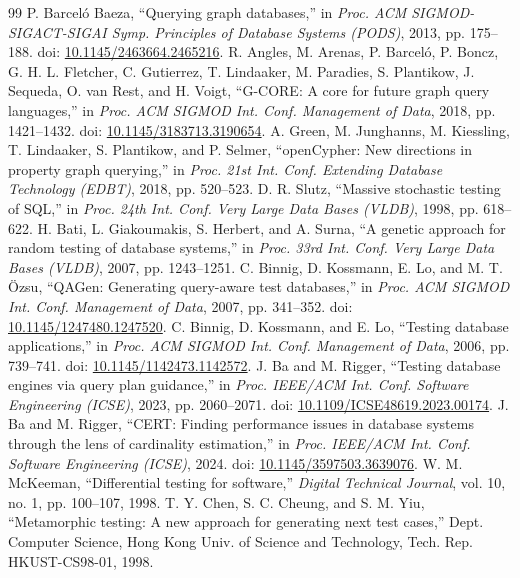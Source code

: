 \documentclass[acmsmall,screen,anonymous]{acmart}
\begin{document}
\begin{thebibliography}{99}
 P. Barceló Baeza, ``Querying graph databases,'' in \emph{Proc. ACM SIGMOD-SIGACT-SIGAI Symp. Principles of Database Systems (PODS)}, 2013, pp. 175--188. doi: \href{https://doi.org/10.1145/2463664.2465216}{10.1145/2463664.2465216}.
 R. Angles, M. Arenas, P. Barceló, P. Boncz, G. H. L. Fletcher, C. Gutierrez, T. Lindaaker, M. Paradies, S. Plantikow, J. Sequeda, O. van Rest, and H. Voigt, ``G-CORE: A core for future graph query languages,'' in \emph{Proc. ACM SIGMOD Int. Conf. Management of Data}, 2018, pp. 1421--1432. doi: \href{https://doi.org/10.1145/3183713.3190654}{10.1145/3183713.3190654}.
 A. Green, M. Junghanns, M. Kiessling, T. Lindaaker, S. Plantikow, and P. Selmer, ``openCypher: New directions in property graph querying,'' in \emph{Proc. 21st Int. Conf. Extending Database Technology (EDBT)}, 2018, pp. 520--523.
 D. R. Slutz, ``Massive stochastic testing of SQL,'' in \emph{Proc. 24th Int. Conf. Very Large Data Bases (VLDB)}, 1998, pp. 618--622.
 H. Bati, L. Giakoumakis, S. Herbert, and A. Surna, ``A genetic approach for random testing of database systems,'' in \emph{Proc. 33rd Int. Conf. Very Large Data Bases (VLDB)}, 2007, pp. 1243--1251.
 C. Binnig, D. Kossmann, E. Lo, and M. T. Özsu, ``QAGen: Generating query-aware test databases,'' in \emph{Proc. ACM SIGMOD Int. Conf. Management of Data}, 2007, pp. 341--352. doi: \href{https://doi.org/10.1145/1247480.1247520}{10.1145/1247480.1247520}.
 C. Binnig, D. Kossmann, and E. Lo, ``Testing database applications,'' in \emph{Proc. ACM SIGMOD Int. Conf. Management of Data}, 2006, pp. 739--741. doi: \href{https://doi.org/10.1145/1142473.1142572}{10.1145/1142473.1142572}.
 J. Ba and M. Rigger, ``Testing database engines via query plan guidance,'' in \emph{Proc. IEEE/ACM Int. Conf. Software Engineering (ICSE)}, 2023, pp. 2060--2071. doi: \href{https://doi.org/10.1109/ICSE48619.2023.00174}{10.1109/ICSE48619.2023.00174}.
 J. Ba and M. Rigger, ``CERT: Finding performance issues in database systems through the lens of cardinality estimation,'' in \emph{Proc. IEEE/ACM Int. Conf. Software Engineering (ICSE)}, 2024. doi: \href{https://doi.org/10.1145/3597503.3639076}{10.1145/3597503.3639076}.
 W. M. McKeeman, ``Differential testing for software,'' \emph{Digital Technical Journal}, vol. 10, no. 1, pp. 100--107, 1998.
 T. Y. Chen, S. C. Cheung, and S. M. Yiu, ``Metamorphic testing: A new approach for generating next test cases,'' Dept. Computer Science, Hong Kong Univ. of Science and Technology, Tech. Rep. HKUST-CS98-01, 1998.

\end{thebibliography}
\end{document}
